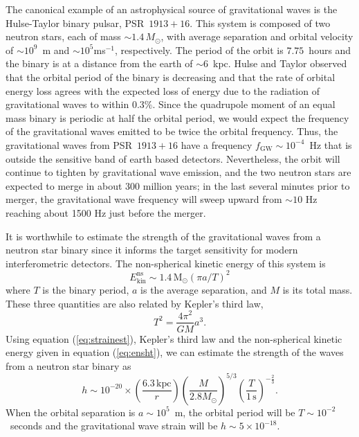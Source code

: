 The canonical example of an astrophysical source of gravitational waves is the
Hulse-Taylor binary pulsar, PSR~$1913+16$\cite{1975ApJ...195L..51H}. This
system is composed of two neutron stars, each of mass $\sim 1.4\,M_\odot$,
with average separation and orbital velocity of $\sim10^9$~m and $\sim
10^5$ms$^{-1}$, respectively. The period of the orbit is $7.75$~hours and the
binary is at a distance from the earth of $\sim 6$~kpc.  Hulse and Taylor
observed that the orbital period of the binary is decreasing and that the rate
of orbital energy loss agrees with the expected loss of energy due to the
radiation of gravitational waves to within
$0.3\%$\cite{Taylor:1982,Taylor:1989}.   Since the quadrupole moment
of an equal mass binary is periodic at half the orbital period, we would
expect the frequency of the gravitational waves emitted to be twice
the orbital frequency.  Thus, the gravitational waves from PSR~$1913+16$ have
a frequency $f_\mathrm{GW} \sim 10^{-4}$~Hz that is outside the
sensitive band of earth based detectors.   Nevertheless,  the orbit
will continue to tighten by gravitational wave emission, and the two
neutron stars are expected to merge in about 300 million years;   in the last
several minutes prior to merger,  the gravitational wave frequency will sweep
upward from $\sim 10$ Hz reaching about 1500 Hz just before the merger.

It is worthwhile to estimate the strength of the gravitational waves from
a neutron star binary since it informs the target sensitivity for
modern interferometric detectors.   The non-spherical kinetic energy
of this system is 
\begin{equation}
E_\mathrm{kin}^\mathrm{ns} \sim 
1.4\,\mathrm{M}_\odot (\pi a / T)^2
\label{eq:ensht}
\end{equation}
where $T$ is the binary period,  $a$ is the average separation,  and
$M$ is its total mass.   These three quantities are also related by 
Kepler's third law,
\begin{equation}
T^2 = \frac{4\pi^2}{GM}a^3.
\label{eq:kep3}
\end{equation}
Using equation (\ref{eq:strainest}), Kepler's third law and the non-spherical
kinetic energy given in equation (\ref{eq:ensht}), we can estimate the 
strength of the waves from a neutron star binary as
\begin{equation}
h \sim 10^{-20} \times 
\left(\frac{6.3\,\mathrm{kpc}}{r}\right)
\left(\frac{M}{2.8M_\odot}\right)^{5/3}
\left(\frac{T}{1\,\mathrm{s}}\right)^{-\frac{2}{3}}.
\label{eq:binaryest}
\end{equation}
When the orbital separation is $a \sim 10^5$~m,  the orbital period will be
$T\sim10^{-2}$~seconds and the gravitational wave strain will be $h \sim 5
\times 10^{-18}$.

